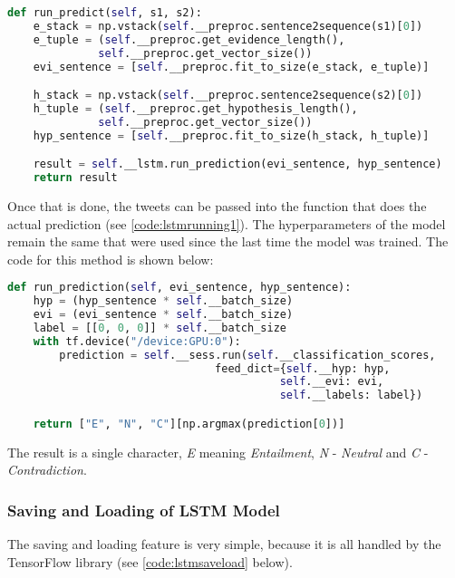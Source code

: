             \begin{lstlisting}[language=Python, caption=Transforming Sentences into Sequences, label=code:lstmrunning1]
def run_predict(self, s1, s2):
    e_stack = np.vstack(self.__preproc.sentence2sequence(s1)[0])
    e_tuple = (self.__preproc.get_evidence_length(),
              self.__preproc.get_vector_size())
    evi_sentence = [self.__preproc.fit_to_size(e_stack, e_tuple)]

    h_stack = np.vstack(self.__preproc.sentence2sequence(s2)[0])
    h_tuple = (self.__preproc.get_hypothesis_length(),
              self.__preproc.get_vector_size())
    hyp_sentence = [self.__preproc.fit_to_size(h_stack, h_tuple)]

    result = self.__lstm.run_prediction(evi_sentence, hyp_sentence)
    return result
            \end{lstlisting}
            
            Once that is done, the tweets can be passed into the function that does the actual prediction (see \cref{code:lstmrunning1}). The hyperparameters of the model remain the same that were used since the last time the model was trained. The code for this method is shown below:
            
            \begin{lstlisting}[language=Python, caption=Running LSTM Prediction, label=code:lstmrunning2]
def run_prediction(self, evi_sentence, hyp_sentence):
    hyp = (hyp_sentence * self.__batch_size)
    evi = (evi_sentence * self.__batch_size)
    label = [[0, 0, 0]] * self.__batch_size
    with tf.device("/device:GPU:0"):
        prediction = self.__sess.run(self.__classification_scores,
                                feed_dict={self.__hyp: hyp,
                                          self.__evi: evi,
                                          self.__labels: label})

    return ["E", "N", "C"][np.argmax(prediction[0])]
            \end{lstlisting}
            
            The result is a single character, \textit{E} meaning \textit{Entailment}, \textit{N} - \textit{Neutral} and \textit{C} - \textit{Contradiction}.
            
        \subsubsection{Saving and Loading of LSTM Model}
            The saving and loading feature is very simple, because it is all handled by the TensorFlow library (see \cref{code:lstmsaveload} below).
            
